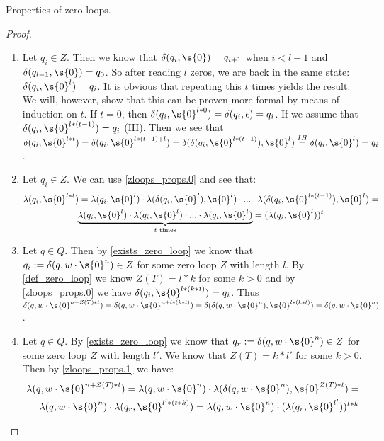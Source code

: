 \begin{proposition}{Properties of zero loops.}
	\begin{proof}\hfill
	\begin{enumerate}
		\item Let $q_i \in Z$. Then we know that $\delta(q_i,\s{0})=q_{i+1}$ when $i<l-1$ and $\delta(q_{l-1},\s{0})=q_{0}$. So after reading $l$ zeros, we are back in the same state: $\delta(q_i,\s{0}^{l})=q_i$. It is obvious that repeating this $t$ times yields the result. We will, however, show that this can be proven more formal by means of induction on $t$. If $t=0$, then $\delta(q_i,\s{0}^{l*0})=\delta(q_i,\epsilon)=q_i$. If we assume that $\delta(q_i,\s{0}^{l*(t-1)})=q_i$ (IH). Then we see that $\delta(q_i,\s{0}^{l*t})=\delta(q_i,\s{0}^{l*(t-1)+l})=\delta(\delta(q_i,\s{0}^{l*(t-1)}),\s{0}^{l})\overset{IH}{=}\delta(q_i,\s{0}^{l})=q_i$.
		\item Let $q_i\in Z$. We can use \cref{zloops_props.0} and see that:
		\begin{gather*}
		\lambda(q_i,\s{0}^{l*t})= 
		\lambda(q_i,\s{0}^l)\cdot\lambda(\delta(q_i,\s{0}^l),\s{0}^l)\cdot...\cdot \lambda(\delta( q_i,\s{0}^{l*(t-1)}),\s{0}^l) = \\
		\underbrace{\lambda(q_i,\s{0}^l)\cdot\lambda(q_i,\s{0}^l)\cdot...\cdot \lambda(q_i,\s{0}^l)}_{t \text{ times}} = 
		(\lambda(q_i,\s{0}^l))^t
		\end{gather*}
		\item Let $q\in Q$. Then by \cref{exists_zero_loop} we know that $q_i := \delta(q,w\cdot \s{0}^{n})\in Z$ for some zero loop $Z$ with length $l$. By \cref{def_zero_loop} we know $Z(T)=l*k$ for some $k>0$ and by \cref{zloops_props.0} we have $\delta(q_i,\s{0}^{l*(k*t)})=q_i$. Thus $\delta(q,w\cdot\s{0}^{n+Z(T)*t})=\delta(q,w\cdot\s{0}^{n+l*(k*t)})=\delta(\delta(q,w\cdot\s{0}^{n}),\s{0}^{l*(k*t)})=\delta(q,w\cdot\s{0}^{n})$.
		\item Let $q\in Q$. By \cref{exists_zero_loop} we know that $q_r := \delta(q,w\cdot \s{0}^{n})\in Z$ for some zero loop $Z$ with length $l'$. We know that $Z(T) = k*l'$ for some $k>0$. Then by \cref{zloops_props.1} we have:
		\begin{align*}
			\lambda(q,w\cdot \s{0}^{n+Z(T)*t})=
			\lambda(q,w\cdot \s{0}^{n})\cdot\lambda(\delta(q,w\cdot \s{0}^{n}),\s{0}^{Z(T)*t})= \\
			\lambda(q,w\cdot \s{0}^{n})\cdot\lambda(q_r,\s{0}^{l'*(t*k)})=
			\lambda(q,w\cdot \s{0}^{n})\cdot(\lambda(q_r,\s{0}^{l'}))^{t*k}
		\end{align*}
	\end{enumerate}
	\end{proof}
\end{proposition}

